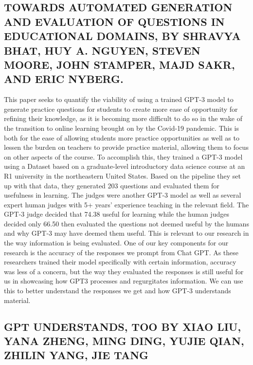 \documentclass[letterpaper, 10 pt, conference]{ieeeconf}  %
\begin{document}
\subsection{TOWARDS AUTOMATED GENERATION AND EVALUATION OF QUESTIONS IN EDUCATIONAL DOMAINS, BY
SHRAVYA BHAT, HUY A. NGUYEN, STEVEN MOORE, JOHN STAMPER, MAJD SAKR, AND ERIC NYBERG.}

This paper seeks to quantify the viability of using a trained GPT-3 model to generate practice questions for students to
create more ease of opportunity for refining their knowledge, as it is becoming more difficult to do so in the wake of the transition
to online learning brought on by the Covid-19 pandemic. This is both for the ease of allowing students more practice opportunities
as well as to lessen the burden on teachers to provide practice material, allowing them to focus on other aspects of the course.
To accomplish this, they trained a GPT-3 model using a Dataset based on a graduate-level introductory data science
course at an R1 university in the northeastern United States. Based on the pipeline they set up with that data, they generated 203
questions and evaluated them for usefulness in learning. The judges were another GPT-3 model as well as several expert human
judges with 5+ years’ experience teaching in the relevant field. The GPT-3 judge decided that 74.38%
useful for learning while the human judges decided only 66.50%
then evaluated the questions not deemed useful by the humans and why GPT-3 may have deemed them useful.
This is relevant to our research in the way information is being evaluated. One of our key components for our research
is the accuracy of the responses we prompt from Chat GPT. As these researchers trained their model specifically with certain
information, accuracy was less of a concern, but the way they evaluated the responses is still useful for us in showcasing how GPT3 processes and regurgitates information. We can use this to better understand the responses we get and how GPT-3 understands
material.

\subsection{GPT UNDERSTANDS, TOO BY XIAO LIU, YANA ZHENG, MING DING, YUJIE QIAN, ZHILIN YANG, JIE TANG}
\end{document}
